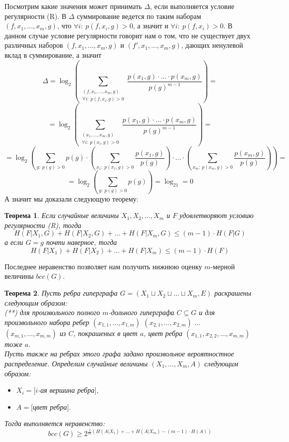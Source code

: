 \documentclass[a4paper]{article}
\newtheorem{mtheorem}{Теорема}[section]
\begin{document}
Посмотрим какие значения может принимать $\Delta$, если выполняется условие регулярности (R). В $\Delta$ 
суммирование ведется по таким наборам $(f, x_1, \ldots, x_m, g)$, что $\forall i:\ p(f,x_i,g)>0$, а 
значит и $\forall i:\ p(f,x_i)>0$. В данном случае условие регулярности говорит нам о том, что
не существует двух различных наборов $(f, x_1, \ldots, x_m, g)$ и $(f', x_1, \ldots, x_m, g)$, дающих 
ненулевой вклад в суммирование, а значит $$\Delta = \log_2\left(\sum\limits_{\substack{(f,x_1,\ldots,x_m,g) 
\\ \forall i:\ p(f,x_i,g)>0}}\frac{p(x_1,g)\cdot\ldots\cdot p(x_m,g)}{p(g)^{m-1}}\right) = $$ 
$$ = \log_2\left(\sum\limits_{\substack{(x_1,\ldots,x_m,g) \\ \forall i:\ p(x_i,g)>0}}\frac{p(x_1,g)\cdot\ldots\cdot p(x_m,g)}{p(g)^{m-1}}\right) = $$
$$ = \log_2\left(\sum\limits_{g:\ p(g) > 0}p(g)\cdot\left(\sum\limits_{x_1:\ p(x_1, g) > 0}\frac{p(x_1,g)}{p(g)}\right)\cdot\ldots
\cdot\left(\sum\limits_{x_m:\ p(x_m, g) > 0}\frac{p(x_m,g)}{p(g)}\right)\right) = $$ 
$$ = \log_2\left(\sum\limits_{g:\ p(g) > 0}p(g)\right) = \log_21 = 0$$ А значит мы доказали следующую теорему:
\begin{mtheorem}
    Если случайные величины $X_1, X_2, \ldots, X_m$ и $F$ удовлетворяют условию регулярности (R), тогда 
    $$H(F|X_1, G) + H(F|X_2, G) + \ldots + H(F|X_m, G) \leq (m-1)\cdot H(F|G)$$ а если $G = g$ 
    почти наверное, тогда $$H(F|X_1) + H(F|X_2) + \ldots + H(F|X_m) \leq (m-1)\cdot H(F)$$
\end{mtheorem}

Последнее неравенство позволяет нам получить нижнюю оценку $m$-мерной величины $bcc(G)$.

\begin{mtheorem}
    Пусть ребра гиперграфа $G = (X_1\sqcup X_2\sqcup \ldots \sqcup X_m, E)$ раскрашены следующим образом:\\
    (**) для произвольного полного $m$-дольного гиперграфа $C\subseteq G$ и для произвольного набора ребер $(x_{1,1}, \ldots, x_{1,m})$ 
    $(x_{2,1}, \ldots, x_{2,m})$ $\ldots$ $(x_{m,1}, \ldots, x_{m,m})$ 
    из $C$, покрашеных в цвет $a$, цвет ребра $(x_{1,1}, x_{2,2}, \ldots, x_{m,m})$ тоже $a$.\ \\
    Пусть также на ребрах этого графа задано произвольное вероятностное распределение. Определим случайные 
    величины $(X_1, \ldots, X_m, A)$ следующим образом:
    \begin{itemize}[noitemsep]
        \item $X_i = [$$i$-ая вершина ребра$]$, 
        \item $A = [$цвет ребра$]$.
    \end{itemize}
    Тогда выполняется неравенство: $$bcc(G) \geq 2^{\frac{1}{m}(H(A|X_1) + \ldots + H(A|X_m) - (m-1)\cdot H(A))}$$
\end{mtheorem}
\end{document}
